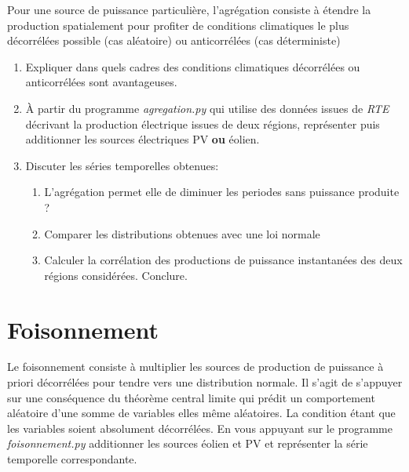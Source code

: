 \documentclass[12pt,a4,french]{article}
\newcommand{\tmtextit}[1]{{\itshape{#1}}}
\begin{document}
Pour une source de puissance particulière, l'agrégation consiste à étendre la production spatialement pour profiter de conditions climatiques le plus décorrélées possible (cas aléatoire) ou anticorrélées (cas déterministe)
\begin{enumerate}
	\item Expliquer dans quels cadres des conditions climatiques décorrélées ou anticorrélées sont avantageuses.
  	\item À partir du programme \tmtextit{agregation.py} qui utilise des
  données issues de \tmtextit{RTE} décrivant la production électrique
  issues de deux régions, représenter puis additionner les sources
  électriques PV \textbf{ou} éolien.
	\item Discuter les séries temporelles obtenues:
  \begin{enumerate}
    \item L'agrégation permet elle de
    diminuer les periodes sans puissance produite ?
    \item Comparer les distributions obtenues avec une loi normale
    \item Calculer la corrélation des productions de puissance instantanées des deux régions considérées. Conclure.
  \end{enumerate}
\end{enumerate}

\section{Foisonnement}

Le foisonnement consiste à multiplier les sources de production de puissance
à priori décorrélées pour tendre vers une distribution normale. Il s'agit de s'appuyer sur une conséquence du théorème central limite qui prédit un
comportement aléatoire d'une somme de variables elles même aléatoires. La
condition étant que les variables soient absolument décorrélées. En vous
appuyant sur le programme \tmtextit{foisonnement.py} additionner les sources
éolien et PV et représenter la série temporelle correspondante.
\end{document}
